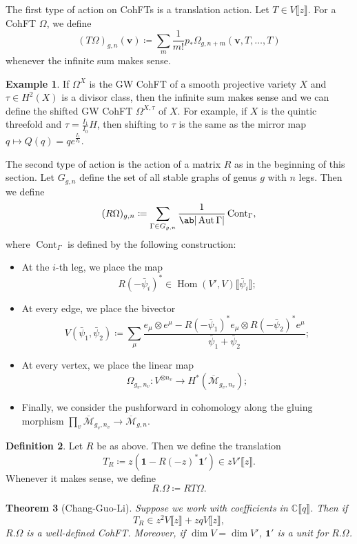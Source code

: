 \documentclass{amsart}
\newtheorem{thm}{Theorem}[section]
\theoremstyle{definition}
\newtheorem{defn}[thm]{Definition}
\newtheorem{exm}[thm]{Example}
\theoremstyle{remark}
\theoremstyle{plain}
\theoremstyle{definition}
\theoremstyle{remark}
\newcommand{\C}{\mathbb{C}}
\newcommand{\Mbar}{\overline{\mathcal{M}}}
\newcommand{\mbf}[1]{\mathbf{#1}}
\newcommand{\bv}{\mbf{v}}
\newcommand{\on}[1]{\operatorname{#1}}
\newcommand{\1}{\mathbf{1}}
\newcommand{\2}{\mathbf{2}}
\newcommand{\3}{\mathbf{3}}
\newcommand{\ps}[1]{\llbracket #1 \rrbracket}
\DeclareMathOperator{\Hom}{Hom}
\DeclareMathOperator{\Aut}{Aut}
\begin{document}
The first type of action on CohFTs is a translation action. Let $T \in V\ps{z}$. For a CohFT $\Omega$, we define
\[ (T\Omega)_{g,n}(\bv) \coloneqq \sum_m \frac{1}{m!} p_* \Omega_{g,n+m}(\bv, T,\ldots,T) \]
whenever the infinite sum makes sense.

\begin{exm}
    If $\Omega^X$ is the GW CohFT of a smooth projective variety $X$ and $\tau \in H^2(X)$ is a divisor class, then the infinite sum makes sense and we can define the shifted GW CohFT $\Omega^{X,\tau}$ of $X$. For example, if $X$ is the quintic threefold and $\tau = \frac{I_1}{I_0} H$, then shifting to $\tau$ is the same as the mirror map $q \mapsto Q(q) = q e^{\frac{I_1}{I_0}}$.
\end{exm}

The second type of action is the action of a matrix $R$ as in the beginning of this section. Let $G_{g,n}$ define the set of all stable graphs of genus $g$ with $n$ legs. Then we define
\[ (R\Omega)_{g,n} \coloneqq \sum_{\Gamma \in G_{g,n}} \frac{1}{\ab|\Aut \Gamma|} \on{Cont}_{\Gamma}, \]
where $\on{Cont}_{\Gamma}$ is defined by the following construction:
\begin{itemize}
    \item At the $i$-th leg, we place the map 
        \[ R(-\bar{\psi}_i)^* \in \Hom(V',V) \ps{\bar{\psi}_i}; \]
    \item At every edge, we place the bivector
        \[ V(\bar{\psi}_1, \bar{\psi}_2) \coloneqq \sum_{\mu} \frac{e_{\mu} \otimes e^{\mu} - R(-\bar{\psi}_1)^* e_{\mu} \otimes R(-\bar{\psi}_2)^* e^{\mu}}{\bar{\psi}_1 + \bar{\psi}_2}; \]
    \item At every vertex, we place the linear map
        \[ \Omega_{g_v, n_v} \colon V^{\otimes n_v} \to H^*(\Mbar_{g_v, n_v}); \]
    \item Finally, we consider the pushforward in cohomology along the gluing morphism $\prod_v \Mbar_{g_v, n_v} \to \Mbar_{g,n}$.
\end{itemize}

\begin{defn}
    Let $R$ be as above. Then we define the translation
    \[ T_R \coloneqq z (\1 - R(-z)^* \1') \in z V'\ps{z}. \]
    Whenever it makes sense, we define
    \[ R.\Omega \coloneqq RT\Omega. \]
\end{defn}

\begin{thm}[Chang-Guo-Li]
    Suppose we work with coefficients in $\C\ps{q}$. Then if
    \[ T_R \in z^2 V \ps{z} + zq V \ps{z}, \]
    $R.\Omega$ is a well-defined CohFT. Moreover, if $\dim V = \dim V'$, $\1'$ is a unit for $R.\Omega$.
\end{thm}
\end{document}
